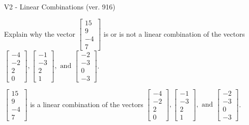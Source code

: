 \begin{exercise}
  \begin{exerciseTitle}V2 - Linear Combinations (ver. 916)\end{exerciseTitle}
  \begin{exerciseStatement}
    Explain why the vector \(\left[\begin{array}{c}
15 \\
9 \\
-4 \\
7
\end{array}\right]\)  is or is not a linear 
	combination of the vectors \(\left[\begin{array}{c}
-4 \\
-2 \\
2 \\
0
\end{array}\right] , \left[\begin{array}{c}
-1 \\
-3 \\
2 \\
1
\end{array}\right] , \text{ and } \left[\begin{array}{c}
-2 \\
-3 \\
0 \\
-3
\end{array}\right]\).
	


  \end{exerciseStatement}
  \begin{exerciseAnswer}
   \(\left[\begin{array}{c}
15 \\
9 \\
-4 \\
7
\end{array}\right]\) 
  	 is  
	a linear combination of the vectors \(\left[\begin{array}{c}
-4 \\
-2 \\
2 \\
0
\end{array}\right] , \left[\begin{array}{c}
-1 \\
-3 \\
2 \\
1
\end{array}\right] , \text{ and } \left[\begin{array}{c}
-2 \\
-3 \\
0 \\
-3
\end{array}\right]\).

	
  


  \end{exerciseAnswer}
\end{exercise}